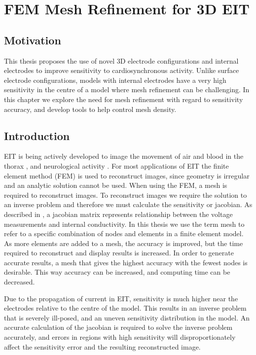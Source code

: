\chapter{FEM Mesh Refinement for 3D EIT}
\label{chap:chapter-4}

\section{Motivation}
This thesis proposes the use of novel 3D electrode configurations 
and internal electrodes to improve sensitivity to 
cardiosynchronous activity. Unlike surface electrode configurations,
models with internal electrodes have a very high 
sensitivity in the centre of a model where mesh refinement can be challenging. 
In this chapter we explore the need for mesh refinement with regard
to sensitivity accuracy, and develop tools to help control mesh density. 

\section{Introduction}

EIT is being actively developed to image the movement of air and 
blood in the thorax \parencite{nguyen_review_2012}, and 
neurological activity \parencite{holder_electrical_1992}. 
For most applications of EIT the finite element method (FEM) is 
used to reconstruct images, since geometry is irregular and 
an analytic solution cannot be used. When using the FEM,
a mesh is required to reconstruct images. 
To reconstruct images we require the solution to an inverse problem and therefore we must calculate the sensitivity or jacobian. 
As described in , a jacobian matrix
represents relationship between the voltage measurements and internal conductivity.
In this thesis we use the term mesh to refer to a specific 
combination of nodes and elements in a finite element model. 
As more elements are added to a mesh, the accuracy is improved,
but the time required to reconstruct and display results is increased. 
In order to generate accurate results, a mesh that gives the highest accuracy 
with the fewest nodes is desirable. This way accuracy can be increased, and
computing time can be decreased.

Due to the propagation of current in EIT, sensitivity is much higher near the
electrodes relative to the centre of the model. This results in an inverse problem
that is severely ill-posed,
and an uneven sensitivity distribution in the model. 
An accurate calculation of the jacobian is required to solve the inverse
problem accurately, and errors in regions with high sensitivity 
will disproportionately affect the sensitivity error and the resulting reconstructed image.

